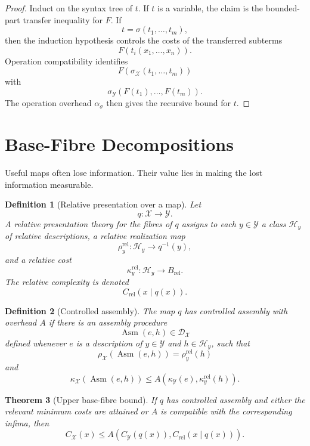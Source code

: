 \documentclass[11pt]{article}
\newtheorem{theorem}{Theorem}[section]
\newtheorem{definition}[theorem]{Definition}
\begin{document}
\begin{proof}
Induct on the syntax tree of \(t\). If \(t\) is a variable, the claim is the bounded-part transfer inequality for \(F\). If
\[
t=\sigma(t_1,\ldots,t_m),
\]
then the induction hypothesis controls the costs of the transferred subterms
\[
F(t_i(x_1,\ldots,x_n)).
\]
Operation compatibility identifies
\[
F(\sigma_\mathcal X(t_1,\ldots,t_m))
\]
with
\[
\sigma_\mathcal Y(F(t_1),\ldots,F(t_m)).
\]
The operation overhead \(\alpha_\sigma\) then gives the recursive bound for \(t\).
\end{proof}

\section{Base-Fibre Decompositions}

Useful maps often lose information. Their value lies in making the lost information measurable.

\begin{definition}[Relative presentation over a map]
Let
\[
q:\mathcal X\to\mathcal Y.
\]
A relative presentation theory for the fibres of \(q\) assigns to each \(y\in\mathcal Y\) a class \(\mathcal H_y\) of relative descriptions, a relative realization map
\[
\rho_y^{\mathrm{rel}}:\mathcal H_y\to q^{-1}(y),
\]
and a relative cost
\[
\kappa_y^{\mathrm{rel}}:\mathcal H_y\to B_{\mathrm{rel}}.
\]
The relative complexity is denoted
\[
C_{\mathrm{rel}}(x\mid q(x)).
\]
\end{definition}

\begin{definition}[Controlled assembly]
The map \(q\) has controlled assembly with overhead \(A\) if there is an assembly procedure
\[
\operatorname{Asm}(e,h)\in\mathcal D_\mathcal X
\]
defined whenever \(e\) is a description of \(y\in\mathcal Y\) and \(h\in\mathcal H_y\), such that
\[
\rho_\mathcal X(\operatorname{Asm}(e,h))=\rho_y^{\mathrm{rel}}(h)
\]
and
\[
\kappa_\mathcal X(\operatorname{Asm}(e,h))
\leq
A(\kappa_\mathcal Y(e),\kappa_y^{\mathrm{rel}}(h)).
\]
\end{definition}

\begin{theorem}[Upper base-fibre bound]
If \(q\) has controlled assembly and either the relevant minimum costs are attained or \(A\) is compatible with the corresponding infima, then
\[
C_\mathcal X(x)
\leq
A(C_\mathcal Y(q(x)),C_{\mathrm{rel}}(x\mid q(x))).
\]
\end{theorem}
\end{document}
